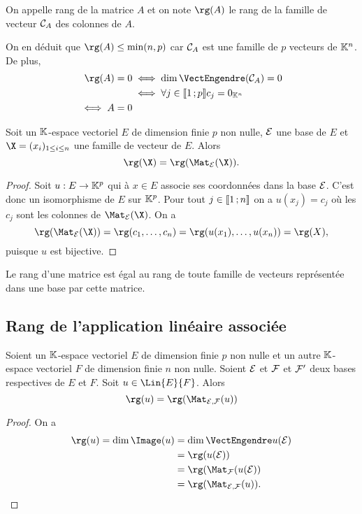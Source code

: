 \begin{defdef}
  On appelle rang de la matrice $A$ et on note $\rg(A)$  le rang de la famille de vecteur $\mathcal{C}_A$ des colonnes de $A$.
\end{defdef}

On en déduit que $\rg(A) \leq \min(n,p)$ car $\mathcal{C}_A$ est une famille de $p$ vecteurs de $\mathbb{K}^n$. De plus,
\begin{align}
  \rg(A) = 0 &\iff \dim \VectEngendre(\courbe_A)=0 \\
  &\iff \forall j \in \intervalleentier{1}{p} c_j = 0_{\K^n} \\
  \iff A=0
\end{align}

\begin{prop}
  Soit un $\mathbb{K}$-espace vectoriel $E$ de dimension finie $p$ non nulle, $\mathcal{E}$ une base de $E$ et $\X=(x_i)_{1\leq i\leq n}$ une famille de vecteur de $E$. Alors
  \begin{equation}
    \rg(\X)=\rg(\Mat_\E(\X)).
  \end{equation}
\end{prop}
\begin{proof}
  Soit $u: E \rightarrow \mathbb{K}^p$ qui à $x \in E$ associe ses coordonnées dans la base $\mathcal{E}$. C'est donc un isomorphisme de $E$ sur $\mathbb{K}^p$. Pour tout $j \in \mathopen{\llbracket}1\mathclose{}\mathpunct{};n\mathclose{\rrbracket}$ on a $u(x_j)=c_j$ où les $c_j$ sont les colonnes de $\Mat_\E(\X)$. On a
  \begin{equation}
    \rg(\Mat_\E(\X)) = \rg(c_1,\ldots,c_n) = \rg(u(x_1),\ldots,u(x_n))=\rg(X),
  \end{equation}
  puisque $u$ est bijective.
\end{proof}

\begin{corth}
  Le rang d'une matrice est égal au rang de toute famille de vecteurs représentée dans une base par cette matrice.
\end{corth}

\subsection{Rang de l'application linéaire associée}

\begin{theo}
  Soient un $\mathbb{K}$-espace vectoriel $E$ de dimension finie $p$ non nulle et un autre $\mathbb{K}$-espace vectoriel $F$ de dimension finie $n$ non nulle. Soient $\mathcal{E}$ et $\mathcal{F}$ et $\mathcal{F}'$ deux bases respectives de $E$ et $F$. Soit $u \in \Lin{E}{F}$. Alors
  \begin{equation}
    \rg(u) = \rg(\Mat_{\E,\F}(u))
  \end{equation}
\end{theo}
\begin{proof}
  On a
  \begin{align}
    \rg(u) = \dim\Image(u) &= \dim \VectEngendre u(\E) \\
    &= \rg(u(\E))\\
    &=\rg(\Mat_{\F}(u(\E))\\
    &=\rg(\Mat_{\E,\F}(u)).
  \end{align}
\end{proof}


